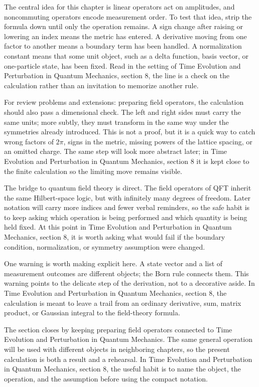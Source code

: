 The central idea for this chapter is linear operators act on amplitudes, and noncommuting operators encode measurement order.  To test that idea, strip the formula down until only the operation remains.  A sign change after raising or lowering an index means the metric has entered.  A derivative moving from one factor to another means a boundary term has been handled.  A normalization constant means that some unit object, such as a delta function, basis vector, or one-particle state, has been fixed.  Read in the setting of Time Evolution and Perturbation in Quantum Mechanics, section 8, the line is a check on the calculation rather than an invitation to memorize another rule.

For review problems and extensions: preparing field operators, the calculation should also pass a dimensional check.  The left and right sides must carry the same units; more subtly, they must transform in the same way under the symmetries already introduced.  This is not a proof, but it is a quick way to catch wrong factors of \(2\pi\), signs in the metric, missing powers of the lattice spacing, or an omitted charge.  The same step will look more abstract later; in Time Evolution and Perturbation in Quantum Mechanics, section 8 it is kept close to the finite calculation so the limiting move remains visible.

The bridge to quantum field theory is direct.  The field operators of QFT inherit the same Hilbert-space logic, but with infinitely many degrees of freedom.  Later notation will carry more indices and fewer verbal reminders, so the safe habit is to keep asking which operation is being performed and which quantity is being held fixed.  At this point in Time Evolution and Perturbation in Quantum Mechanics, section 8, it is worth asking what would fail if the boundary condition, normalization, or symmetry assumption were changed.

One warning is worth making explicit here.  A state vector and a list of measurement outcomes are different objects; the Born rule connects them.  This warning points to the delicate step of the derivation, not to a decorative aside.  In Time Evolution and Perturbation in Quantum Mechanics, section 8, the calculation is meant to leave a trail from an ordinary derivative, sum, matrix product, or Gaussian integral to the field-theory formula.

The section closes by keeping preparing field operators connected to Time Evolution and Perturbation in Quantum Mechanics.  The same general operation will be used with different objects in neighboring chapters, so the present calculation is both a result and a rehearsal.  In Time Evolution and Perturbation in Quantum Mechanics, section 8, the useful habit is to name the object, the operation, and the assumption before using the compact notation.




